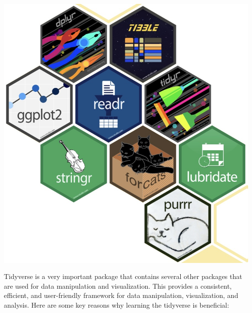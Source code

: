 \documentclass[
  letterpaper,
  DIV=11,
  numbers=noendperiod]{scrreprt}
\begin{document}
\includegraphics[width=1\textwidth,height=\textheight]{./images/WIT_1.jpg}

Tidyverse is a very important package that contains several other
packages that are used for data manipulation and visualization. This
provides a consistent, efficient, and user-friendly framework for data
manipulation, visualization, and analysis. Here are some key reasons why
learning the tidyverse is beneficial:
\end{document}
